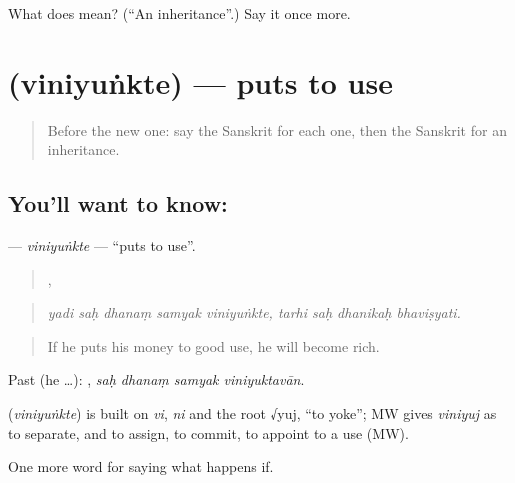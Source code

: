 \begin{tcolorbox}[breakable,colback=teal!4,colframe=teal!35!black,title={Before you move on}]
What does  mean? (\textquotedblleft{}An inheritance\textquotedblright{}.) Say it once more.
\end{tcolorbox}
\section[\texorpdfstring{\sk{विनियुंक्ते} (viniyuṅkte)}{विनियुंक्ते (viniyuṅkte)}]{ (viniyuṅkte) — puts to use}

\label{lesson:SA-C550-viniyunkte}



\begin{quote}
Before the new one: say the Sanskrit for each one, then the Sanskrit for an inheritance.
\end{quote}

\subsection*{You'll want to know: }
\textbf{} — \emph{viniyuṅkte} — \textquotedblleft{}puts to use\textquotedblright{}.

\begin{quote}
    ,    
\end{quote}

\begin{quote}
\emph{yadi saḥ dhanaṃ samyak viniyuṅkte, tarhi saḥ dhanikaḥ bhaviṣyati.}
\end{quote}

\begin{quote}
If he puts his money to good use, he will become rich.
\end{quote}

Past (he …):    , \emph{saḥ dhanaṃ samyak viniyuktavān}.

\begin{cousinweb}
\textbf{} (\emph{viniyuṅkte}) is built on \emph{vi}, \emph{ni} and the root √yuj, \textquotedblleft{}to yoke\textquotedblright{}; MW gives \emph{viniyuj} as to separate, and to assign, to commit, to appoint to a use (MW).
\end{cousinweb}

\begin{grammarlens}[title={What you've built}]
One more word for saying what happens if.
\end{grammarlens}

